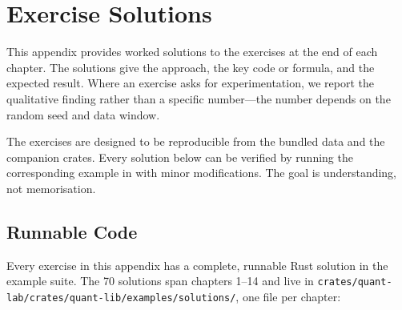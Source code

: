 \chapter{Exercise Solutions}
\label{app:solutions}

This appendix provides worked solutions to the exercises at the end of
each chapter. The solutions give the approach, the key code or formula,
and the expected result. Where an exercise asks for experimentation, we
report the qualitative finding rather than a specific number---the
number depends on the random seed and data window.

\begin{keyinsight}
The exercises are designed to be reproducible from the bundled data
and the companion crates. Every solution below can be verified by
running the corresponding example in  with minor
modifications. The goal is understanding, not memorisation.
\end{keyinsight}

\section*{Runnable Code}
\label{app:solutions:code}

Every exercise in this appendix has a complete, runnable Rust
solution in the  example suite. The 70 solutions
span chapters 1--14 and live in
\texttt{crates/quant-lab/crates/quant-lib/examples/solutions/}, one
file per chapter:

